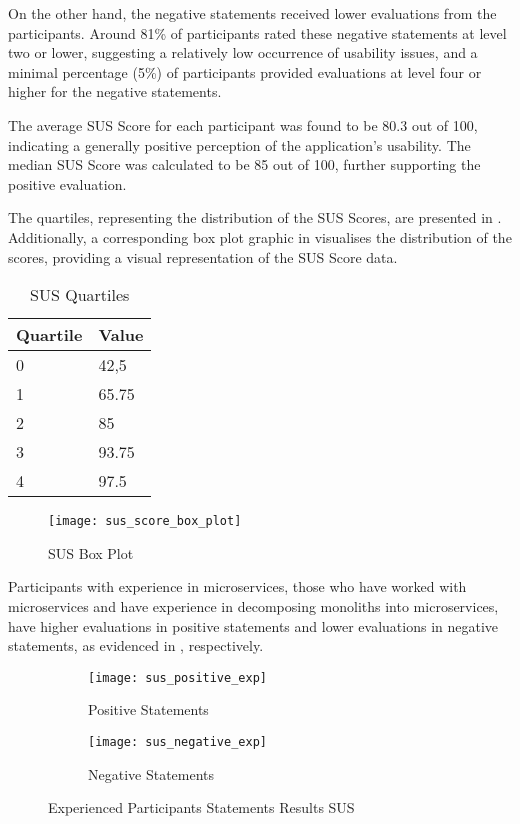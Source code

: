 On the other hand, the negative statements received lower evaluations from the
participants. Around 81\% of participants rated these negative statements at
level two or lower, suggesting a relatively low occurrence of usability issues,
and a minimal percentage (5\%) of participants provided evaluations at level
four or higher for the negative statements.

The average SUS Score for each participant was found to be 80.3 out of 100,
indicating a generally positive perception of the application's usability. The
median SUS Score was calculated to be 85 out of 100, further supporting the
positive evaluation.

The quartiles, representing the distribution of the SUS Scores, are presented
in . Additionally, a corresponding box plot graphic in
 visualises the distribution of the scores, providing a
visual representation of the SUS Score data.

\begin{table}[!htb] \caption{SUS Quartiles} \label{tab:sus_quartiles}
  \begin{center}
    \begin{tabular}[c]{p{8em}|p{8em}}
      \textbf{Quartile} &
      \textbf{Value} \\
      \hline 0 & 42,5 \\
      \hline 1 & 65.75 \\
      \hline 2 & 85 \\
      \hline 3 & 93.75 \\
      \hline 4 & 97.5 \\
    \end{tabular}
  \end{center}
\end{table}

\begin{figure*}[!htb]
  \centering
  \texttt{[image: sus\_score\_box\_plot]}
  \caption{SUS Box Plot}
  \label{fig:sus_box_plot}
\end{figure*}

Participants with experience in microservices, those who have worked with
microservices and have experience in decomposing monoliths into microservices,
have higher evaluations in positive statements and lower evaluations in
negative statements, as evidenced in
,
respectively.

\begin{figure*}[!htb]
  \centering
  \begin{subfigure}[b]{1\textwidth}
    \texttt{[image: sus\_positive\_exp]}
    \caption{Positive Statements}
    \label{fig:statements_results_sus_positive_exp}
  \end{subfigure}
  \hfill
  \begin{subfigure}[b]{1\textwidth}
    \texttt{[image: sus\_negative\_exp]}
    \caption{Negative Statements}
    \label{fig:statements_results_sus_negative_exp}
  \end{subfigure}
  \caption{Experienced Participants Statements Results SUS}
  \label{fig:statements_results_sus_exp}
\end{figure*}
